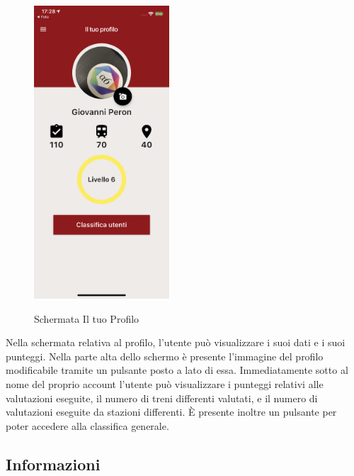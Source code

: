 \begin{figure}[htp]
    {\includegraphics[width=0.45\textwidth]{immagini/ios/profilo.png}} \quad
    \caption{Schermata Il tuo Profilo}
    \label{fig:ilTuoProfilo}
\end{figure}

Nella schermata relativa al profilo, l'utente può visualizzare i suoi dati e i suoi punteggi. Nella parte alta dello schermo è presente l'immagine del profilo modificabile tramite un pulsante posto a lato di essa. Immediatamente sotto al nome del proprio account l'utente può visualizzare i punteggi relativi alle valutazioni eseguite, il numero di treni differenti valutati, e il numero di valutazioni eseguite da stazioni differenti. È presente inoltre un pulsante per poter accedere alla classifica generale.

\pagebreak

\subsection{Informazioni}

